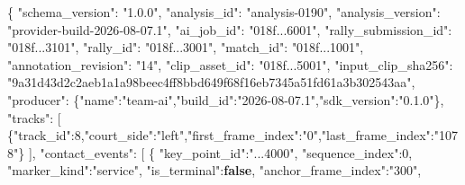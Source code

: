 \documentclass[
  9pt,
  a4paper,
]{article}
\newenvironment{Shaded}{}{}
\newcommand{\DataTypeTok}[1]{\textcolor[rgb]{0.56,0.13,0.00}{#1}}
\newcommand{\DecValTok}[1]{\textcolor[rgb]{0.25,0.63,0.44}{#1}}
\newcommand{\FunctionTok}[1]{\textcolor[rgb]{0.02,0.16,0.49}{#1}}
\newcommand{\KeywordTok}[1]{\textcolor[rgb]{0.00,0.44,0.13}{\textbf{#1}}}
\newcommand{\OtherTok}[1]{\textcolor[rgb]{0.00,0.44,0.13}{#1}}
\newcommand{\StringTok}[1]{\textcolor[rgb]{0.25,0.44,0.63}{#1}}
\begin{document}
\begin{Shaded}
\begin{Highlighting}[]
\FunctionTok{\{}
  \DataTypeTok{"schema\_\allowbreak{}version"}\FunctionTok{:} \StringTok{"1.0.0"}\FunctionTok{,}
  \DataTypeTok{"analysis\_\allowbreak{}id"}\FunctionTok{:} \StringTok{"analysis{-}0190"}\FunctionTok{,}
  \DataTypeTok{"analysis\_\allowbreak{}version"}\FunctionTok{:} \StringTok{"provider{-}build{-}2026{-}08{-}07.1"}\FunctionTok{,}
  \DataTypeTok{"ai\_\allowbreak{}job\_\allowbreak{}id"}\FunctionTok{:} \StringTok{"018f...6001"}\FunctionTok{,}
  \DataTypeTok{"rally\_\allowbreak{}submission\_\allowbreak{}id"}\FunctionTok{:} \StringTok{"018f...3101"}\FunctionTok{,}
  \DataTypeTok{"rally\_\allowbreak{}id"}\FunctionTok{:} \StringTok{"018f...3001"}\FunctionTok{,}
  \DataTypeTok{"match\_\allowbreak{}id"}\FunctionTok{:} \StringTok{"018f...1001"}\FunctionTok{,}
  \DataTypeTok{"annotation\_\allowbreak{}revision"}\FunctionTok{:} \StringTok{"14"}\FunctionTok{,}
  \DataTypeTok{"clip\_\allowbreak{}asset\_\allowbreak{}id"}\FunctionTok{:} \StringTok{"018f...5001"}\FunctionTok{,}
  \DataTypeTok{"input\_\allowbreak{}clip\_\allowbreak{}sha256"}\FunctionTok{:} \StringTok{"9a31d43d2c2aeb1a1a98beec4ff8bbd649f68f16eb7345a51fd61a3b302543aa"}\FunctionTok{,}
  \DataTypeTok{"producer"}\FunctionTok{:} \FunctionTok{\{}\DataTypeTok{"name"}\FunctionTok{:}\StringTok{"team{-}ai"}\FunctionTok{,}\DataTypeTok{"build\_\allowbreak{}id"}\FunctionTok{:}\StringTok{"2026{-}08{-}07.1"}\FunctionTok{,}\DataTypeTok{"sdk\_\allowbreak{}version"}\FunctionTok{:}\StringTok{"0.1.0"}\FunctionTok{\},}
  \DataTypeTok{"tracks"}\FunctionTok{:} \OtherTok{[}
    \FunctionTok{\{}\DataTypeTok{"track\_\allowbreak{}id"}\FunctionTok{:}\DecValTok{8}\FunctionTok{,}\DataTypeTok{"court\_\allowbreak{}side"}\FunctionTok{:}\StringTok{"left"}\FunctionTok{,}\DataTypeTok{"first\_\allowbreak{}frame\_\allowbreak{}index"}\FunctionTok{:}\StringTok{"0"}\FunctionTok{,}\DataTypeTok{"last\_\allowbreak{}frame\_\allowbreak{}index"}\FunctionTok{:}\StringTok{"1078"}\FunctionTok{\}}
  \OtherTok{]}\FunctionTok{,}
  \DataTypeTok{"contact\_\allowbreak{}events"}\FunctionTok{:} \OtherTok{[}
    \FunctionTok{\{}
      \DataTypeTok{"key\_\allowbreak{}point\_\allowbreak{}id"}\FunctionTok{:}\StringTok{"...4000"}\FunctionTok{,}
      \DataTypeTok{"sequence\_\allowbreak{}index"}\FunctionTok{:}\DecValTok{0}\FunctionTok{,}
      \DataTypeTok{"marker\_\allowbreak{}kind"}\FunctionTok{:}\StringTok{"service"}\FunctionTok{,}
      \DataTypeTok{"is\_\allowbreak{}terminal"}\FunctionTok{:}\KeywordTok{false}\FunctionTok{,}
      \DataTypeTok{"anchor\_\allowbreak{}frame\_\allowbreak{}index"}\FunctionTok{:}\StringTok{"300"}\FunctionTok{,}

\end{Highlighting}
\end{Shaded}
\end{document}

